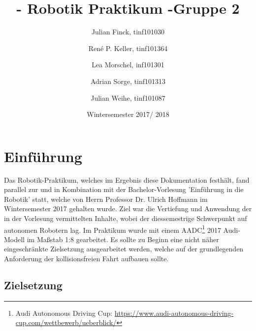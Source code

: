 \documentclass[12pt,a4paper]{report}
\begin{document}

\title{- Robotik Praktikum -\endgraf Gruppe 2}
\author{
  Julian Finck, tinf101030 \and
  René P. Keller, tinf101364 \and
  Lea Morschel, inf101301 \and
  Adrian Sorge, tinf101313 \and
  Julian Weihe, tinf101087}
\date{Wintersemester 2017/ 2018}
\maketitle

\newpage
\tableofcontents %
\newpage




\chapter{Einführung}

Das Robotik-Praktikum, welches im Ergebnis diese Dokumentation festhält, fand parallel zur und in Kombination mit der Bachelor-Vorlesung 'Einführung in die Robotik' statt, welche von Herrn Professor Dr. Ulrich Hoffmann im Wintersemester 2017 gehalten wurde.
Ziel war die Vertiefung und Anwendung der in der Vorlesung vermittelten Inhalte, wobei der diessemestrige Schwerpunkt  auf autonomen Robotern lag. Im Praktikum wurde mit einem AADC\footnote{Audi Autonomous Driving Cup: \url{https://www.audi-autonomous-driving-cup.com/wettbewerb/ueberblick/}} 2017 Audi-Modell im Maßstab 1:8 gearbeitet. Es sollte zu Beginn eine nicht näher eingeschränkte Zielsetzung ausgearbeitet werden, welche auf der grundlegenden Anforderung der kollisionsfreien Fahrt aufbauen sollte.

\section{Zielsetzung}
\end{document}
